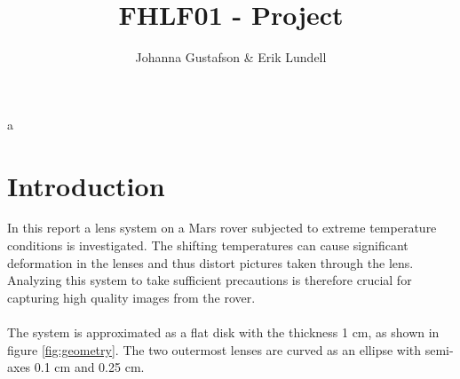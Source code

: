 \documentclass[a4paper,11pt]{article}
\title{\textbf{FHLF01} - Project}
\author{Johanna Gustafson \& Erik Lundell}
\date{}
\begin{document}

\maketitle
a
\section{Introduction}
In this report a lens system on a Mars rover subjected to extreme temperature conditions is investigated. The shifting temperatures can cause significant deformation in the lenses and thus distort pictures taken through the lens. Analyzing this system to take sufficient precautions is therefore crucial for capturing high quality images from the rover.\\
\\The system is approximated as a flat disk with the thickness 1 cm, as shown in figure \ref{fig:geometry}. The two outermost lenses are curved as an ellipse with semi-axes 0.1 cm and 0.25 cm.
\end{document}
